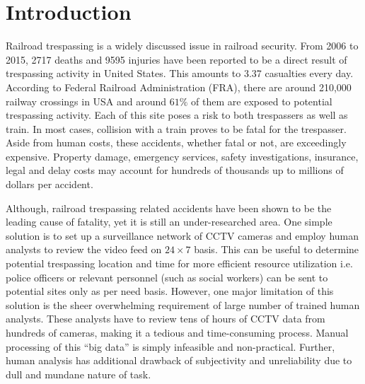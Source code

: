 \section{Introduction}
Railroad trespassing is a widely discussed issue in railroad security. From 2006 to 2015, 2717 deaths and 9595 injuries have been reported to be a direct result of trespassing activity in United States\cite{zhang2018automated}. This amounts to 3.37 casualties every day. According to Federal Railroad Administration (FRA), there are around 210,000 railway crossings in USA and around $61\%$ of them are exposed to potential trespassing activity\cite{zhang2018automated}. Each of this site poses a risk to both trespassers as well as train. In most cases, collision with a train proves to be fatal for the trespasser. Aside from human costs, these accidents, whether fatal or not, are exceedingly expensive. Property damage, emergency services, safety investigations, insurance, legal and delay costs may account for hundreds of thousands up to millions of dollars per accident\cite{goldberg1998train}. 

Although, railroad trespassing related accidents have been shown to be the leading cause of fatality\cite{pelletier1997deaths,matzopoulos1998hours,lobb2003evaluation,evans2003accidental}, yet it is still an under-researched area\cite{lobb2006trespassing}. One simple solution is to set up a surveillance network of CCTV cameras and employ human analysts to review the video feed on $24 \times 7$
basis. This can be useful to determine potential trespassing location and time for more efficient resource utilization i.e. police officers or relevant personnel (such as social workers) can be sent to potential sites only as per need basis. However, one major limitation of this solution is the sheer overwhelming requirement of large number of trained human analysts. These analysts have to review tens of hours of CCTV data from hundreds of cameras, making it a tedious and time-consuming process. Manual processing of this ``big data'' is simply infeasible and non-practical. Further, human analysis has additional drawback of subjectivity and unreliability due to dull and mundane nature of task\cite{norouznezhad2008high}.

